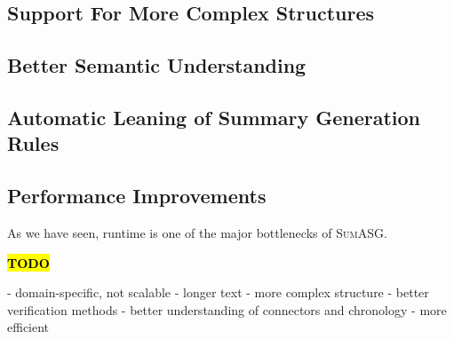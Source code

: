 \subsection{Support For More Complex Structures}

\subsection{Better Semantic Understanding}

\subsection{Automatic Leaning of Summary Generation Rules}

\subsection{Performance Improvements}

As we have seen, runtime is one of the major bottlenecks of \textsc{SumASG}.

\textcolor{red}{\textbf{\hl{TODO}}}

- domain-specific, not scalable
- longer text
- more complex structure
- better verification methods
- better understanding of connectors and chronology
- more efficient